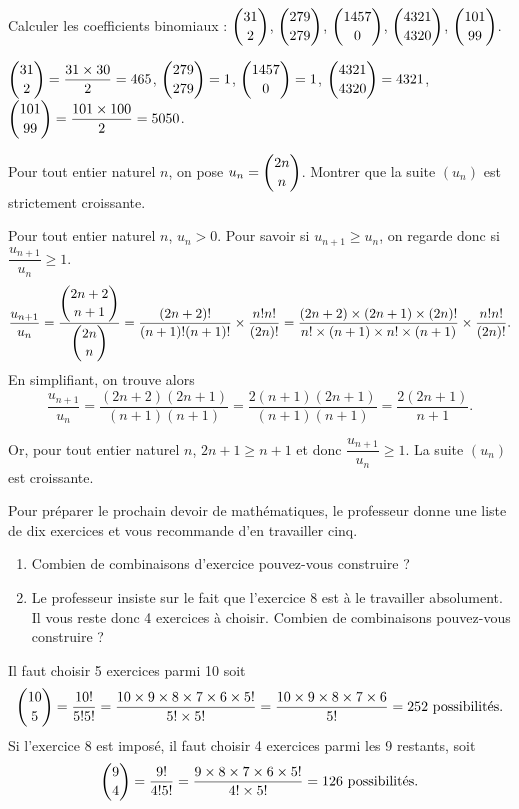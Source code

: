 \documentclass[11pt,fleqn, openany]{book} %
\begin{document}
\begin{exercise}Calculer les coefficients binomiaux : $\dbinom{31}{2}$, $\dbinom{279}{279}$, $\dbinom{1457}{0}$, $\dbinom{4321}{4320}$, $\dbinom{101}{99}$.\end{exercise}


\begin{solution}$\dbinom{31}{2}=\dfrac{31 \times 30 }{2} = 465$, $\dbinom{279}{279}=1$, $\dbinom{1457}{0}=1$, $\dbinom{4321}{4320}=4321$, $\dbinom{101}{99}=\dfrac{101 \times 100}{2}=5050$.\end{solution}




\begin{exercise}Pour tout entier naturel $n$, on pose $u_n=\dbinom{2n}{n}$. Montrer que la suite $(u_n)$ est strictement croissante.\end{exercise}

\begin{solution}Pour tout entier naturel $n$, $u_n>0$. Pour savoir si $u_{n+1} \geqslant u_n$, on regarde donc si $\dfrac{u_{n+1}}{u_n}\geqslant 1$.
\[ \dfrac{u_{n+1}}{u_n}=\dfrac{\dbinom{2n+2}{n+1}}{\dbinom{2n}{n}}=\dfrac{(2n+2)!}{(n+1)!(n+1)!} \times \dfrac{n! n!}{(2n)!}=\dfrac{(2n+2) \times (2n+1) \times (2n)!}{n! \times (n+1) \times n! \times (n+1)} \times \dfrac{n! n!}{(2n)!}.\]
En simplifiant, on trouve alors
\[ \dfrac{u_{n+1}}{u_n}=\dfrac{(2n+2)(2n+1)}{(n+1)(n+1)}=\dfrac{2(n+1)(2n+1)}{(n+1)(n+1)}=\dfrac{2(2n+1)}{n+1}.\]

Or, pour tout entier naturel $n$, $2n+1 \geqslant n+1$ et donc $\dfrac{u_{n+1}}{u_n}\geqslant 1$. La suite $(u_n)$ est croissante. \end{solution}



\begin{exercise}Pour préparer le prochain devoir de mathématiques, le professeur donne une liste de dix exercices et vous recommande d'en travailler cinq.
\begin{enumerate}
\item Combien de combinaisons d'exercice pouvez-vous construire ?
\item Le professeur insiste sur le fait que l'exercice 8 est à le travailler absolument. Il vous reste donc 4 exercices à choisir. Combien de combinaisons pouvez-vous construire ?
\end{enumerate}\end{exercise}

\begin{solution}Il faut choisir 5 exercices parmi 10 soit 
\[ \dbinom{10}{5}=\dfrac{10!}{5!5!}=\dfrac{10 \times 9 \times 8 \times 7 \times 6 \times 5!}{5!\times 5!}= \dfrac{10 \times 9 \times 8 \times 7 \times 6 }{ 5!}=252\text{ possibilités.}\]
Si l'exercice 8 est imposé, il faut choisir 4 exercices parmi les 9 restants, soit
\[ \dbinom{9}{4}=\dfrac{9!}{4!5!}=\dfrac{9 \times 8 \times 7 \times 6 \times 5!}{4!\times 5!}=126 \text{ possibilités.}\]\end{solution}
\end{document}
